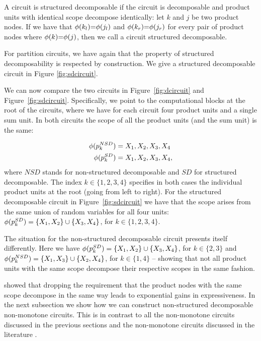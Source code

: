 \begin{definition}
	A circuit is structured decomposable if the circuit is decomposable and product units with identical scope decompose identically: let $k$ and $j$ be two product nodes. If we have that $\phi (k_l) {=} \phi(j_l)$ and $\phi (k_r) {=} \phi(j_r)$ for every pair of product nodes where $\phi(k) {=} \phi(j)$, then we call a circuit structured decomposable.
\end{definition}


For partition circuits, we have again that the property of structured decomposability is respected by construction.
We give a structured decomposable circuit in Figure \ref{fig:sdcircuit}.




We can now compare the two circuits in Figure~\ref{fig:dcircuit} and Figure~\ref{fig:sdcircuit}. Specifically, we point to the computational blocks at the root of the circuits, where we have for each circuit four product units and a single sum unit. In both circuits the scope of all the product units (and the sum unit) is the same:

\begin{align}
	\phi(p_{k}^{NSD}) & = {X_1,X_2,X_3,X_4 }
	\\
	\phi(p_{k}^{SD})  & = {X_1,X_2,X_3,X_4 },
\end{align}
where $NSD$ stands for non-structured decomposable and $SD$ for structured decomposable. The index $k \in \{1,2,3,4 \}$ specifies in both cases the individual product units at the root (going from left to right). For the structured decomposable circuit in Figure~\ref{fig:sdcircuit} we have that the scope arises from the same union of random variables for all four units: $\phi(p_{k}^{SD}) =  \{X_1,X_2 \} \cup \{X_3,X_4 \}$, for $k \in \{1,2,3,4 \}$.

The situation for the non-structured decomposable circuit presents itself differently. Here we have $\phi(p_{k}^{SD}) =  \{X_1,X_2\} \cup \{X_3,X_4 \}$, for $k \in \{2,3\}$ and $\phi(p_{k}^{NSD}) =  \{X_1,X_3\} \cup \{X_2,X_4 \}$, for $k \in \{1,4 \}$ -- showing that not all product units with the same scope decompose their respective scopes in the same fashion.

\citet{pipatsrisawat2008new} showed that dropping the requirement that the product nodes with the same scope decompose in the same way leads to exponential gains in expressiveness. In the next subsection we show how we can construct non-structured decomposable non-monotone circuits. This is in contrast to all the non-monotone circuits discussed in the previous sections and the non-monotone circuits discussed in the literature \citep{sladek2023encoding,loconte2025sum,loconte2024subtractive,wangrelationship}.




















